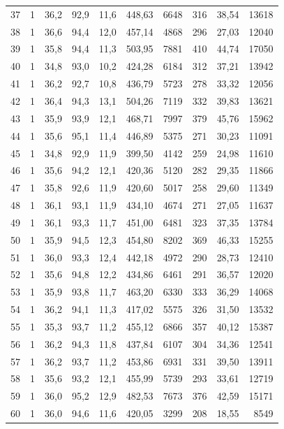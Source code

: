 \documentclass[11pt,a4paper]{article}
\begin{document}
{\begin{longtable}{r c r r r r r r r r}
37 & 1 & 36,2 & 92,9 & 11,6 & 448,63 & 6648 & 316 & 38,54 & 13618 \\
38 & 1 & 36,6 & 94,4 & 12,0 & 457,14 & 4868 & 296 & 27,03 & 12040 \\
39 & 1 & 35,8 & 94,4 & 11,3 & 503,95 & 7881 & 410 & 44,74 & 17050 \\
40 & 1 & 34,8 & 93,0 & 10,2 & 424,28 & 6184 & 312 & 37,21 & 13942 \\
41 & 1 & 36,2 & 92,7 & 10,8 & 436,79 & 5723 & 278 & 33,32 & 12056 \\
42 & 1 & 36,4 & 94,3 & 13,1 & 504,26 & 7119 & 332 & 39,83 & 13621 \\
43 & 1 & 35,9 & 93,9 & 12,1 & 468,71 & 7997 & 379 & 45,76 & 15962 \\
44 & 1 & 35,6 & 95,1 & 11,4 & 446,89 & 5375 & 271 & 30,23 & 11091 \\
45 & 1 & 34,8 & 92,9 & 11,9 & 399,50 & 4142 & 259 & 24,98 & 11610 \\
46 & 1 & 35,6 & 94,2 & 12,1 & 420,36 & 5120 & 282 & 29,35 & 11866 \\
47 & 1 & 35,8 & 92,6 & 11,9 & 420,60 & 5017 & 258 & 29,60 & 11349 \\
48 & 1 & 36,1 & 93,1 & 11,9 & 434,10 & 4674 & 271 & 27,05 & 11637 \\
49 & 1 & 36,1 & 93,3 & 11,7 & 451,00 & 6481 & 323 & 37,35 & 13784 \\
50 & 1 & 35,9 & 94,5 & 12,3 & 454,80 & 8202 & 369 & 46,33 & 15255 \\
51 & 1 & 36,0 & 93,3 & 12,4 & 442,18 & 4972 & 290 & 28,73 & 12410 \\
52 & 1 & 35,6 & 94,8 & 12,2 & 434,86 & 6461 & 291 & 36,57 & 12020 \\
53 & 1 & 35,9 & 93,8 & 11,7 & 463,20 & 6330 & 333 & 36,29 & 14068 \\
54 & 1 & 36,2 & 94,1 & 11,3 & 417,02 & 5575 & 326 & 31,50 & 13532 \\
55 & 1 & 35,3 & 93,7 & 11,2 & 455,12 & 6866 & 357 & 40,12 & 15387 \\
56 & 1 & 36,2 & 94,3 & 11,8 & 437,84 & 6107 & 304 & 34,36 & 12541 \\
57 & 1 & 36,2 & 93,7 & 11,2 & 453,86 & 6931 & 331 & 39,50 & 13911 \\
58 & 1 & 35,6 & 93,2 & 12,1 & 455,99 & 5739 & 293 & 33,61 & 12719 \\
59 & 1 & 36,0 & 95,2 & 12,9 & 482,53 & 7673 & 376 & 42,59 & 15171 \\
60 & 1 & 36,0 & 94,6 & 11,6 & 420,05 & 3299 & 208 & 18,55 & 8549 \\

\end{longtable}}
\end{document}
